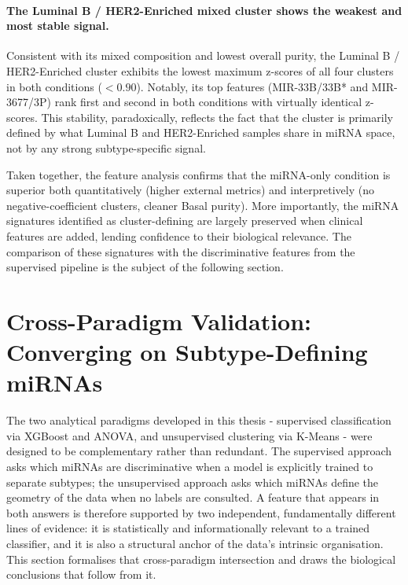 \paragraph{The Luminal B / HER2-Enriched mixed cluster shows the weakest and most
stable signal.}
Consistent with its mixed composition and lowest overall purity, the Luminal B /
HER2-Enriched cluster exhibits the lowest maximum z-scores of all four clusters in both
conditions ($< 0.90$). Notably, its top features (MIR-33B/33B* and MIR-3677/3P)
rank first and second in both conditions with virtually identical z-scores. This
stability, paradoxically, reflects the fact that the cluster is primarily defined by
what Luminal B and HER2-Enriched samples share in miRNA space, not by any strong
subtype-specific signal.

Taken together, the feature analysis confirms that the miRNA-only condition is superior
both quantitatively (higher external metrics) and interpretively (no negative-coefficient
clusters, cleaner Basal purity). More importantly, the miRNA signatures identified as
cluster-defining are largely preserved when clinical features are added, lending
confidence to their biological relevance. The comparison of these signatures with the
discriminative features from the supervised pipeline is the subject of the following
section.

\FloatBarrier

\section{Cross-Paradigm Validation: Converging on Subtype-Defining miRNAs}
\label{sec:unsupervised:comparison}

The two analytical paradigms developed in this thesis - supervised classification via
XGBoost and ANOVA, and unsupervised clustering via K-Means - were designed to be
complementary rather than redundant. The supervised approach asks which miRNAs are
discriminative when a model is explicitly trained to separate subtypes; the unsupervised
approach asks which miRNAs define the geometry of the data when no labels are consulted.
A feature that appears in both answers is therefore supported by two independent, 
fundamentally different lines of evidence: it is statistically and informationally 
relevant to a trained classifier, and it is also a structural anchor of the
data's intrinsic organisation. This section formalises that cross-paradigm intersection
and draws the biological conclusions that follow from it.

